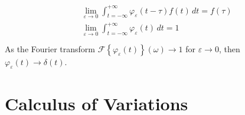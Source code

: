 \documentclass[letterpaper,10pt,english]{jupyterBook}
\begin{document}
\begin{enumerate}
\begin{equation*}
\begin{split}\begin{aligned}
      & \lim_{\varepsilon \rightarrow 0} \int_{t = -\infty}^{+\infty} \varphi_{\varepsilon}(t- \tau) f(t) \, dt = f(\tau) \\
      & \lim_{\varepsilon \rightarrow 0} \int_{t = -\infty}^{+\infty} \varphi_{\varepsilon}(t) \, dt = 1 \\
    \end{aligned}\end{split}
\end{equation*}
\sphinxAtStartPar
As the Fourier transform \(\mathscr{F}\left\{\varphi_{\varepsilon}(t)\right\}(\omega) \rightarrow 1\) for \(\varepsilon \rightarrow 0\), then \(\varphi_{\varepsilon}(t) \rightarrow \delta(t)\).

\end{enumerate}



\sphinxstepscope


\part{Calculus of Variations}

\sphinxstepscope
\end{document}
